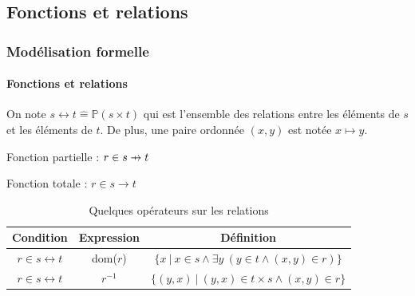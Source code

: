 \documentclass[11pt,a4paper,xcolor=table]{beamer} %
\newcommand{\Bequal}{\mathrel{\widehat{=}}}
\def\p#1{\mathrel{\ooalign{\hfil$\mapstochar\mkern 5mu$\hfil\cr$#1$}}}
\def \pfun  {\p\rightarrow}
\begin{document}
\subsection{Fonctions et relations}
\begin{frame}
\frametitle{Modélisation formelle}
\framesubtitle{Fonctions et relations}
On note  $ s \leftrightarrow t \Bequal \mathbb{P}(s \times t)$ qui est l'ensemble des relations entre les éléments de $s$ et les éléments de $t$. De plus, une paire ordonnée $(x, y)$ est notée $x \mapsto y$.

Fonction partielle : $r \in s \pfun t$

Fonction totale :  $r \in s \rightarrow t$ 
\pause
{\arraycolsep=1.4pt
\renewcommand{\arraystretch}{2}
\begin{table}
\centering
\begin{tabular}[h]{|c | c | c|}
\hline
\bf Condition & \bf Expression &  \bf Définition \tabularnewline
\hline 
$r \in s \leftrightarrow t$ & dom($r$) & $\{ x~|~x\in s \wedge \exists y~(y \in t \wedge (x, y)  \in r)\}$  \tabularnewline
$r \in s \leftrightarrow t$ & $r^{-1}$ & $\{(y, x)~|~(y, x) \in t \times s \wedge (x, y) \in r\}$ \tabularnewline
\hline
\end{tabular}
\caption{Quelques opérateurs sur les relations}
\end{table}
}

\end{frame}

\end{document}
